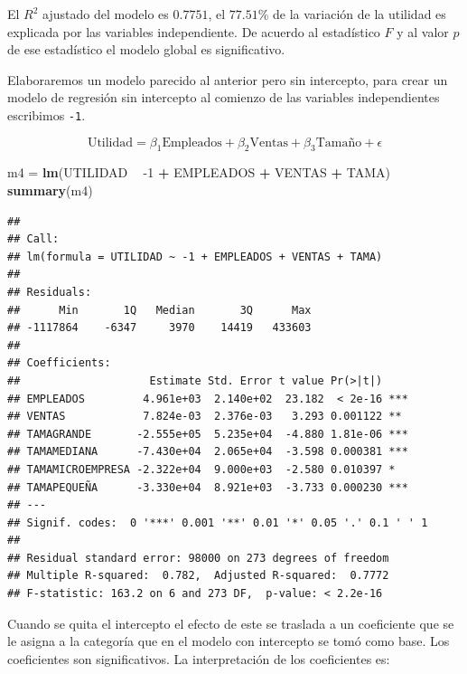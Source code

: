 \documentclass[
]{krantz}
\makeatletter
\newenvironment{Shaded}{\begin{snugshade}}{\end{snugshade}}
\newcommand{\DecValTok}[1]{\textcolor[rgb]{0.06,0.06,0.06}{#1}}
\newcommand{\KeywordTok}[1]{\textcolor[rgb]{0.27,0.27,0.27}{\textbf{#1}}}
\newcommand{\NormalTok}[1]{#1}
\newcommand{\OperatorTok}[1]{\textcolor[rgb]{0.43,0.43,0.43}{\textbf{#1}}}
\newcommand{\StringTok}[1]{\textcolor[rgb]{0.5,0.5,0.5}{#1}}
\newenvironment{kframe}{%
\medskip{}
\setlength{\fboxsep}{.8em}
 \def\at@end@of@kframe{}%
 \ifinner\ifhmode%
  \def\at@end@of@kframe{\end{minipage}}%
  \begin{minipage}{\columnwidth}%
 \fi\fi%
 \def\FrameCommand##1{\hskip\@totalleftmargin \hskip-\fboxsep
 \colorbox{shadecolor}{##1}\hskip-\fboxsep
     \hskip-\linewidth \hskip-\@totalleftmargin \hskip\columnwidth}%
 \MakeFramed {\advance\hsize-\width
   \@totalleftmargin\z@ \linewidth\hsize
   \@setminipage}}%
 {\par\unskip\endMakeFramed%
 \at@end@of@kframe}
\renewenvironment{Shaded}{\begin{kframe}}{\end{kframe}}
\makeatother
\begin{document}
El \(R^2\) ajustado del modelo es \(0.7751\), el \(77.51\)\% de la variación de la utilidad es explicada por las variables independiente. De acuerdo al estadístico \(F\) y al valor \(p\) de ese estadístico el modelo global es significativo.

Elaboraremos un modelo parecido al anterior pero sin intercepto, para crear un modelo de regresión sin intercepto al comienzo de las variables independientes escribimos \texttt{-1}.

\begin{equation}
  \text{Utilidad} =  \beta_1 \text{Empleados} + \beta_2 \text{Ventas} + \beta_3 \text{Tamaño} + \epsilon
    \label{eq:modelo5}
\end{equation}

\begin{Shaded}
\begin{Highlighting}[]
\NormalTok{m4 =}\StringTok{ }\KeywordTok{lm}\NormalTok{(UTILIDAD }\OperatorTok{~}\StringTok{ }\DecValTok{-1} \OperatorTok{+}\StringTok{ }\NormalTok{EMPLEADOS }\OperatorTok{+}\StringTok{ }\NormalTok{VENTAS }\OperatorTok{+}\StringTok{ }\NormalTok{TAMA)}
\KeywordTok{summary}\NormalTok{(m4)}
\end{Highlighting}
\end{Shaded}

\begin{verbatim}
## 
## Call:
## lm(formula = UTILIDAD ~ -1 + EMPLEADOS + VENTAS + TAMA)
## 
## Residuals:
##      Min       1Q   Median       3Q      Max 
## -1117864    -6347     3970    14419   433603 
## 
## Coefficients:
##                    Estimate Std. Error t value Pr(>|t|)    
## EMPLEADOS         4.961e+03  2.140e+02  23.182  < 2e-16 ***
## VENTAS            7.824e-03  2.376e-03   3.293 0.001122 ** 
## TAMAGRANDE       -2.555e+05  5.235e+04  -4.880 1.81e-06 ***
## TAMAMEDIANA      -7.430e+04  2.065e+04  -3.598 0.000381 ***
## TAMAMICROEMPRESA -2.322e+04  9.000e+03  -2.580 0.010397 *  
## TAMAPEQUEÑA      -3.330e+04  8.921e+03  -3.733 0.000230 ***
## ---
## Signif. codes:  0 '***' 0.001 '**' 0.01 '*' 0.05 '.' 0.1 ' ' 1
## 
## Residual standard error: 98000 on 273 degrees of freedom
## Multiple R-squared:  0.782,  Adjusted R-squared:  0.7772 
## F-statistic: 163.2 on 6 and 273 DF,  p-value: < 2.2e-16
\end{verbatim}

Cuando se quita el intercepto el efecto de este se traslada a un coeficiente que se le asigna a la categoría que en el modelo con intercepto se tomó como base. Los coeficientes son significativos. La interpretación de los coeficientes es:
\end{document}
